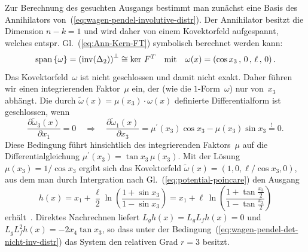 \begin{example}
Zur Berechnung des gesuchten Ausgangs bestimmt man zunächst eine Basis
des Annihilators von~(\ref{eq:wagen-pendel-involutive-distr}). Der
Annihilator besitzt die Dimension $n-k=1$ und wird daher von einem
Kovektorfeld aufgespannt, welches entspr. Gl.~(\ref{eq:Ann-Kern-FT})
symbolisch berechnet werden kann:
\[
{\operatorname{span}}\left\{ \omega\right\} =\left({\operatorname{inv}}(\Delta_{2})\right)^{\perp}\cong\ker\,F^{T}\quad\text{mit}\quad\omega(x)=\left(\cos x_{3}\,,\,0\,,\,\ell\,,\,0\right).
\]
Das Kovektorfeld~$\omega$ ist nicht geschlossen und damit nicht
exakt. Daher führen wir einen integrierenden Faktor~$\mu$ ein, der
(wie die $1$-Form~$\omega$) nur von~$x_{3}$ abhängt. Die durch
$\widetilde{\omega}(x)=\mu(x_{3})\cdot\omega(x)$ definierte Differentialform
ist geschlossen, wenn 
\[
\frac{\partial\widetilde{\omega}_{3}(x)}{\partial x_{1}}=0\quad\Longrightarrow\quad\frac{\partial\widetilde{\omega}_{1}(x)}{\partial x_{3}}=\mu^{\prime}(x_{3})\cos x_{3}-\mu(x_{3})\sin x_{3}\stackrel{!}{=}0.
\]
Diese Bedingung führt hinsichtlich des integrierenden Faktors~$\mu$
auf die Differentialgleichung $\mu^{\prime}(x_{3})=\tan x_{3}\,\mu(x_{3})$.
Mit der Lösung $\mu(x_{3})=1/\cos x_{3}$ ergibt sich das Kovektorfeld
$\widetilde{\omega}(x)=(1,0,\ell/\cos x_{3},0)$, aus dem man durch
Intergration nach Gl.~(\ref{eq:potential-poincare}) den Ausgang
\[
h(x)=x_{1}+\frac{\ell}{2}\ln\left(\frac{1+\sin x_{3}}{1-\sin x_{3}}\right)=x_{1}+\ell\,\ln\left(\frac{1+\tan\frac{x_{3}}{2}}{1-\tan\frac{x_{3}}{2}}\right)
\]
erhält~\cite{zikmund2006}. Direktes Nachrechnen liefert $L_{g}h(x)=L_{g}L_{f}h(x)=0$
und $L_{g}L_{f}^{2}h(x)=-2x_{4}\tan x_{3}$, so dass unter der Bedingung~(\ref{eq:wagen-pendel-det-nicht-inv-distr})
das System den relativen Grad $r=3$ besitzt.
\end{example}

